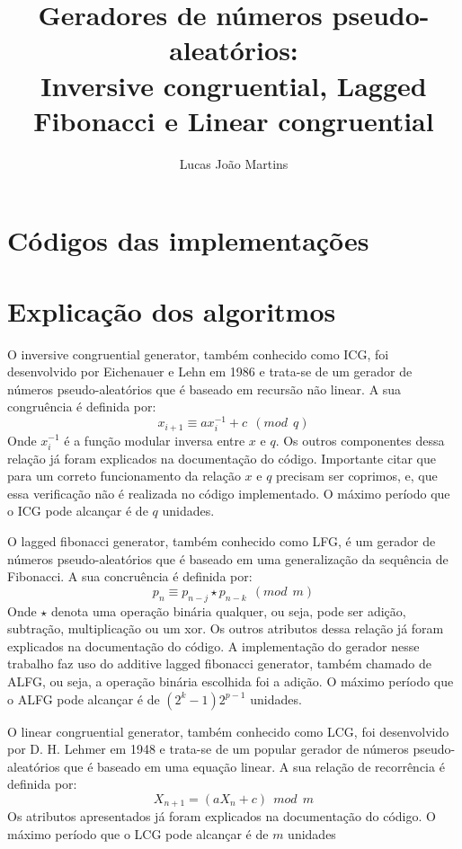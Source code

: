 \documentclass[12pt]{article}
\title{
  Geradores de números pseudo-aleatórios: \\
  \large Inversive congruential, Lagged Fibonacci e Linear congruential}
\author{Lucas João Martins}
\date{}
\begin{document}
\maketitle

\section{Códigos das implementações}




\section{Explicação dos algoritmos}
O inversive congruential generator, também conhecido como ICG, foi desenvolvido
por Eichenauer e Lehn em 1986 e trata-se de um gerador de números
pseudo-aleatórios que é baseado em recursão não linear. A sua congruência é
definida por:
\begin{equation}
  x_{i+1} \equiv ax_i^{-1} + c \ \ (mod \ \ q)
\end{equation}
Onde $x_i^{-1}$ é a função modular inversa entre $x$ e $q$. Os outros
componentes dessa relação já foram explicados na documentação do código.
Importante citar que para um correto funcionamento da relação $x$ e $q$ precisam
ser coprimos, e, que essa verificação não é realizada no código implementado. O
máximo período que o ICG pode alcançar é de $q$ unidades.

O lagged fibonacci generator, também conhecido como LFG, é um gerador de números
pseudo-aleatórios que é baseado em uma generalização da sequência de Fibonacci.
A sua concruência é definida por:
\begin{equation}
  p_{n} \equiv p_{n-j} \star p_{n-k} \ \ (mod \ \ m)
\end{equation}
Onde $\star$ denota uma operação binária qualquer, ou seja, pode ser adição,
subtração, multiplicação ou um xor. Os outros atributos dessa relação já foram
explicados na documentação do código. A implementação do gerador nesse trabalho
faz uso do additive lagged fibonacci generator, também chamado de ALFG, ou seja,
a operação binária escolhida foi a adição. O máximo período que o ALFG pode
alcançar é de $(2^k - 1)2^{p-1}$ unidades.

O linear congruential generator, também conhecido como LCG, foi desenvolvido por
D. H. Lehmer em 1948 e trata-se de um popular gerador de números
pseudo-aleatórios que é baseado em uma equação linear. A sua relação de
recorrência é definida por:
\begin{equation}
  X_{n+1} = (aX_n + c) \ \ mod \ \ m
\end{equation}
Os atributos apresentados já foram explicados na documentação do código. O
máximo período que o LCG pode alcançar é de $m$ unidades
\end{document}
